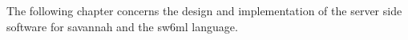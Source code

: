 The following chapter concerns the design and implementation of the server side software for savannah and the sw6ml language.